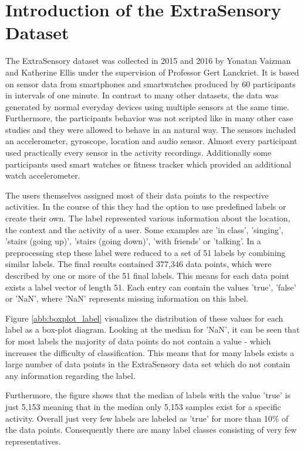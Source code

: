 \section{Introduction of the ExtraSensory Dataset}

The ExtraSensory dataset was collected in 2015 and 2016 by Yonatan Vaizman and Katherine Ellis under the supervision of Professor Gert Lanckriet. It is based on sensor data from smartphones and smartwatches produced by 60 participants in intervals of one minute. In contrast to many other datasets, the data was generated by normal everyday devices using multiple sensors at the same time. Furthermore, the participants behavior was not scripted like in many other case studies and they were allowed to behave in an natural way. The sensors included an accelerometer, gyroscope, location and audio sensor. Almost every participant used practically every sensor in the activity recordings. Additionally some participants used smart watches or fitness tracker which provided an additional watch accelerometer.

The users themselves assigned most of their data points to the respective activities. In the course of this they had the option to use predefined labels or create their own. The label represented various information about the location, the context and the activity of a user. Some examples are 'in class', 'singing', 'stairs (going up)', 'stairs (going down)', 'with friends' or 'talking'. In a preprocessing step these label were reduced to a set of 51 labels by combining similar labels.
The final results contained 377,346 data points, which were described by one or more of the 51 final labels. This means for each data point exists a label vector of length 51. Each entry can contain the values 'true', 'false' or 'NaN', where 'NaN' represents missing information on this label.

Figure \ref{abb:boxplot_label} visualizes the distribution of these values for each label as a box-plot diagram. Looking at the median for 'NaN', it can be seen that for most labels the majority of data points do not contain a value - which increases the difficulty of classification. This means that for many labels exists a large number of data points in the ExtraSensory data set which do not contain any information regarding the label.

Furthermore, the figure shows that the median of labels with the value 'true' is just 5,153 meaning that in the median only 5,153 samples exist for a specific activity. Overall just very few labels are labeled as 'true' for more than 10\% of the data points. Consequently there are many label classes consisting of very few representatives. 

